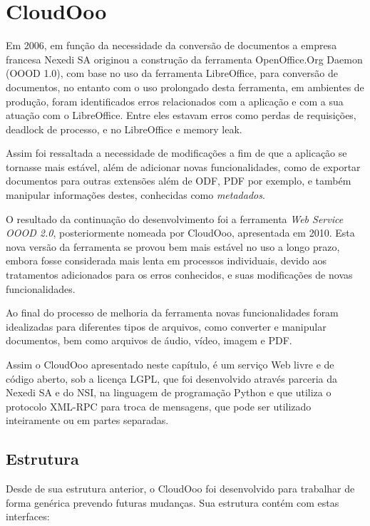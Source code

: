 \chapter{CloudOoo}

Em 2006, em função da necessidade da conversão de documentos a empresa francesa Nexedi SA originou a construção da ferramenta OpenOffice.Org Daemon (OOOD 1.0), com base no uso da ferramenta LibreOffice, para conversão de documentos, no entanto com o uso prolongado desta ferramenta, em ambientes de produção, foram identificados erros relacionados com a aplicação e com a sua atuação com o LibreOffice. Entre eles estavam erros como perdas de requisições, deadlock de processo, e no LibreOffice e memory leak.

Assim foi ressaltada a necessidade de modificações a fim de que a aplicação se tornasse mais estável, além de adicionar novas funcionalidades, como de exportar documentos para outras extensões além de ODF, PDF por exemplo, e também manipular informações destes, conhecidas como \textit{metadados}.

O resultado da continuação do desenvolvimento foi a ferramenta \textit{Web Service OOOD 2.0}, posteriormente nomeada por CloudOoo, apresentada em 2010. Esta nova versão da ferramenta se provou bem mais estável no uso a longo prazo, embora fosse considerada mais lenta em processos individuais, devido aos tratamentos adicionados para os erros conhecidos, e suas modificações de novas funcionalidades.

Ao final do processo de melhoria da ferramenta novas funcionalidades foram idealizadas para diferentes tipos de arquivos, como converter e manipular documentos, bem como arquivos de áudio, vídeo, imagem e PDF.

Assim o CloudOoo apresentado neste capítulo, é um serviço Web livre e de código aberto, sob a licença LGPL, que foi desenvolvido através parceria da Nexedi SA e do NSI, na linguagem de programação Python e que utiliza o protocolo XML-RPC para troca de mensagens, que pode ser utilizado inteiramente ou em partes separadas.

\section{Estrutura}

Desde de sua estrutura anterior, o CloudOoo foi desenvolvido para trabalhar de forma genérica prevendo futuras mudanças. Sua estrutura contém com estas interfaces:

